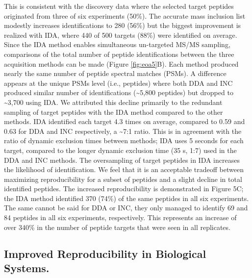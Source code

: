 This is consistent with the discovery data where the selected target peptides originated from three of six experiments (50\%). The accurate mass inclusion list modestly increases identifications to 280 (56\%) but the biggest improvement is realized with IDA, where 440 of 500 targets (88\%) were identified on average. Since the IDA method enables simultaneous un-targeted MS/MS sampling, comparisons of the total number of peptide identifications between the three acquisition methods can be made (Figure \ref{fig:eoa5}B). Each method produced nearly the same number of peptide spectral matches (PSMs). A difference appears at the unique PSMs level (i.e., peptides) where both DDA and INC produced similar number of identifications (\textasciitilde5,800 peptides) but dropped to \textasciitilde3,700 using IDA. We attributed this decline primarily to the redundant sampling of target peptides with the IDA method compared to the other methods. IDA identified each target 4.3 times on average, compared to 0.59 and 0.63 for DDA and INC respectively, a \textasciitilde7:1 ratio. This is in agreement with the ratio of dynamic exclusion times between methods; IDA uses 5 seconds for each target, compared to the longer dynamic exclusion time (35 s, 1:7) used in the DDA and INC methods. The oversampling of target peptides in IDA increases the likelihood of identification. We feel that it is an acceptable tradeoff between maximizing reproducibility for a subset of peptides and a slight decline in total identified peptides. The increased reproducibility is demonstrated in Figure 5C; the IDA method identified 370 (74\%) of the same peptides in all six experiments. The same cannot be said for DDA or INC, they only managed to identify 69 and 84 peptides in all six experiments, respectively. This represents an increase of over 340\% in the number of peptide targets that were seen in all replicates.

\subsection*{Improved Reproducibility in Biological Systems.}

